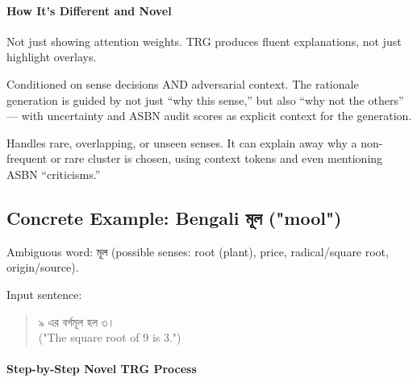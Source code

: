\documentclass[a4paper,12pt]{article}
\begin{document}
\paragraph{How It's Different and Novel}

Not just showing attention weights. TRG produces fluent explanations, not just highlight overlays.

Conditioned on sense decisions AND adversarial context. The rationale generation is guided by not just ``why this sense,'' but also ``why not the others'' — with uncertainty and ASBN audit scores as explicit context for the generation.

Handles rare, overlapping, or unseen senses. It can explain away why a non-frequent or rare cluster is chosen, using context tokens and even mentioning ASBN ``criticisms.''

\subsection*{Concrete Example: Bengali \textbengali{মূল} ("mool")}

Ambiguous word: \textbengali{মূল} (possible senses: root (plant), price, radical/square root, origin/source).

Input sentence:
\begin{quote}
\textbengali{৯ এর বর্গমূল হল ৩।}\\
("The square root of 9 is 3.")
\end{quote}

\paragraph{Step-by-Step Novel TRG Process}
\end{document}
